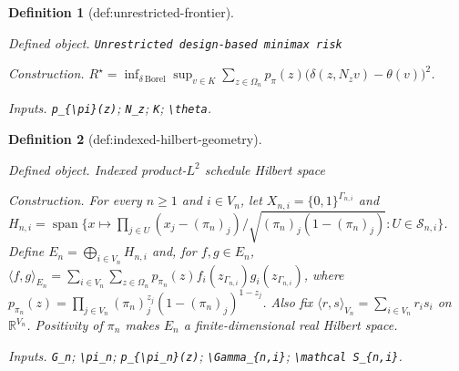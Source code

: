 \documentclass{article}
\newtheorem{definition}{Definition}
\begin{document}
\begin{definition}[def:unrestricted-frontier]\label{def:unrestricted-frontier}
\par\smallskip\noindent\emph{Defined object.} \texttt{Unrestricted design-\allowbreak{}based minimax risk}
\par\smallskip\noindent\emph{Construction.} \(R^{\star}=\inf_{\delta\ \mathrm{Borel}}\sup_{v\in K}\sum_{z\in\Omega_n}p_{\pi}(z)\bigl(\delta(z,N_zv)-\theta(v)\bigr)^2\).
\par\smallskip\noindent\emph{Inputs.} \texttt{p\_\allowbreak{}\{\textbackslash{}\allowbreak{}pi\}\allowbreak{}(z)}; \texttt{N\_\allowbreak{}z}; \texttt{K}; \texttt{\textbackslash{}\allowbreak{}theta}.
\end{definition}

\begin{definition}[def:indexed-hilbert-geometry]\label{def:indexed-hilbert-geometry}
\par\smallskip\noindent\emph{Defined object.} Indexed product-\(L^2\) schedule Hilbert space
\par\smallskip\noindent\emph{Construction.} For every \(n\ge1\) and \(i\in V_n\), let \(X_{n,i}=\{0,1\}^{\Gamma_{n,i}}\) and \(H_{n,i}=\operatorname{span}\{x\mapsto\prod_{j\in U}(x_j-(\pi_n)_j)/\sqrt{(\pi_n)_j(1-(\pi_n)_j)}:U\in\mathcal S_{n,i}\}\). Define \(E_n=\bigoplus_{i\in V_n}H_{n,i}\) and, for \(f,g\in E_n\), \(\langle f,g\rangle_{E_n}=\sum_{i\in V_n}\sum_{z\in\Omega_n}p_{\pi_n}(z)f_i(z_{\Gamma_{n,i}})g_i(z_{\Gamma_{n,i}})\), where \(p_{\pi_n}(z)=\prod_{j\in V_n}(\pi_n)_j^{z_j}(1-(\pi_n)_j)^{1-z_j}\). Also fix \(\langle r,s\rangle_{V_n}=\sum_{i\in V_n}r_is_i\) on \(\mathbb R^{V_n}\). Positivity of \(\pi_n\) makes \(E_n\) a finite-dimensional real Hilbert space.
\par\smallskip\noindent\emph{Inputs.} \texttt{G\_\allowbreak{}n}; \texttt{\textbackslash{}\allowbreak{}pi\_\allowbreak{}n}; \texttt{p\_\allowbreak{}\{\textbackslash{}\allowbreak{}pi\_\allowbreak{}n\}\allowbreak{}(z)}; \texttt{\textbackslash{}\allowbreak{}Gamma\_\allowbreak{}\{n,\allowbreak{}i\}\allowbreak{}}; \texttt{\textbackslash{}\allowbreak{}mathcal S\_\allowbreak{}\{n,\allowbreak{}i\}\allowbreak{}}.
\end{definition}
\end{document}
